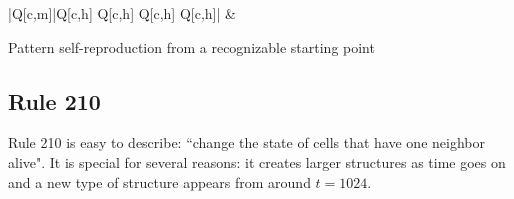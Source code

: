 \documentclass{article}
\begin{document}
\begin{table}[H]
\begin{tblr}{|Q[c,m]|Q[c,h] Q[c,h] Q[c,h] Q[c,h]|}
             &
             \vspace{0pt} \\ 
        \hline
    \end{tblr}
    \caption{Pattern self-reproduction from a recognizable starting point}
    \label{tab:my_label}
\end{table}


\pagebreak
\subsection{Rule 210} \label{rule-210}
Rule 210 is easy to describe: ``change the state of cells that have one neighbor alive". It is special for several reasons: it creates larger structures as time goes on and a new type of structure appears from around $t=1024$.
\end{document}
